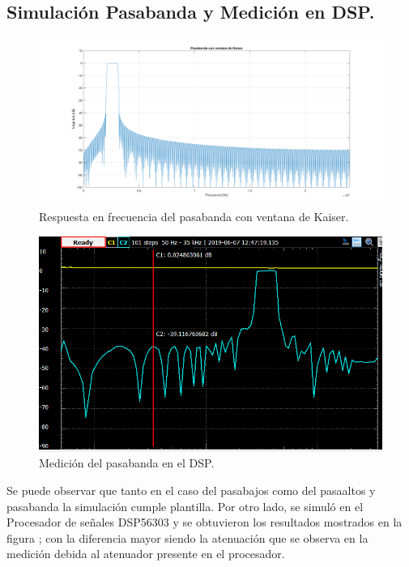 \subsection{Simulación Pasabanda y Medición en DSP.}
\begin{figure}[H]
  \includegraphics[scale=.35]{./images/3/pasabandakaisermodulo.png}
  \caption{Respuesta en frecuencia del pasabanda con ventana de Kaiser.}
\end{figure}
\begin{figure}[H]
  \centering
  \includegraphics[scale=1]{./images/3/pasabandagrupo2mod.png}
  \caption{Medición del pasabanda en el DSP.}
  \label{fig:dsp}
\end{figure}
Se puede observar que tanto en el caso del pasabajos como del pasaaltos y pasabanda la simulación cumple plantilla. Por otro lado, se simuló en el Procesador de señales DSP56303 y se obtuvieron los resultados mostrados en la figura ; con la diferencia mayor siendo la atenuación que se observa en la medición debida al atenuador presente en el procesador.
